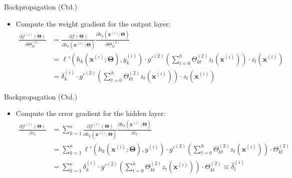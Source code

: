 \begin{frame}{Backpropagation (Ctd.)}{}\important
	\begin{itemize}
		\item Compute the weight gradient for the output layer:
		\begin{align*}
			\frac{\partial \mathcal{J}^{(i)}(\bm{\Theta})}{\partial \Theta_{kl}^{(2)}}
				&= \frac{\partial \mathcal{J}(\bm{\Theta})}{\partial h_k(\bm{x}^{(i)}; \bm{\Theta})}
					\frac{\partial h_k(\bm{x}^{(i)}; \bm{\Theta})}{\partial \Theta_{kl}^{(2)}} \\
				&= \ell'(h_k(\bm{x}^{(i)}; \bm{\Theta}), y_k^{(i)}) \cdot g'^{(2)} \left( \sum_{t=0}^h \Theta_{kt}^{(2)} z_t(\bm{x}^{(i)}) \right)
					\cdot z_l(\bm{x}^{(i)}) \\
				&= \delta_k^{(i)} \cdot g'^{(2)} \left( \sum_{t=0}^h \Theta_{kt}^{(2)} z_t(\bm{x}^{(i)}) \right) \cdot z_l(\bm{x}^{(i)})
		\end{align*}
	\end{itemize}
\end{frame}


\begin{frame}{Backpropagation (Ctd.)}{}\important
	\begin{itemize}
		\item Compute the error gradient for the hidden layer:
		\begin{align*}
			\frac{\partial \mathcal{J}^{(i)}(\bm{\Theta})}{\partial z_l}
				&= \sum_{k=1}^\kappa \frac{\partial \mathcal{J}^{(i)}(\bm{\Theta})}{\partial h_k(\bm{x}^{(i)}; \bm{\Theta})}
					\frac{\partial h_k(\bm{x}^{(i)}; \bm{\Theta})}{\partial z_l} \\
				&= \sum_{k=1}^\kappa \ell'(h_k(\bm{x}^{(i)}; \bm{\Theta}), y^{(i)})
					\cdot g'^{(2)}\left( \sum_{t=0}^h \Theta_{kt}^{(2)} z_t(\bm{x}^{(i)}) \right) \cdot \Theta_{kl}^{(2)} \\
				&= \sum_{k=1}^\kappa \delta_k^{(i)} \cdot g'^{(2)} \left( \sum_{t=0}^h \Theta_{kt}^{(2)} z_t(\bm{x}^{(i)}) \right)
					\cdot \Theta_{kl}^{(2)} \equiv \widehat{\delta}_l^{(i)}
		\end{align*}
	\end{itemize}
\end{frame}


